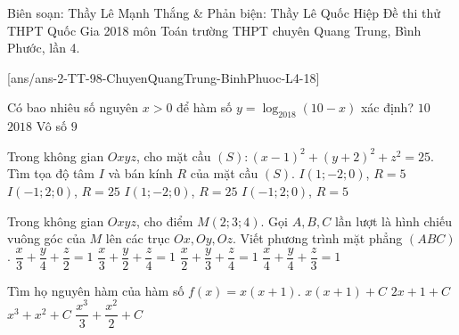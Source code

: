 \begin{name}
{Biên soạn: Thầy Lê Mạnh Thắng \& Phản biện: Thầy Lê Quốc Hiệp}
{Đề thi thử THPT Quốc Gia 2018 môn Toán trường THPT chuyên Quang Trung, Bình Phước, lần 4.}
\end{name}
\setcounter{ex}{0}\setcounter{bt}{0}
[ans/ans-2-TT-98-ChuyenQuangTrung-BinhPhuoc-L4-18]
\begin{ex}%
	Có bao nhiêu số nguyên $x>0$ để hàm số $y=\log_{2018}{(10-x)}$ xác định?
	\choice
	{$10$}
	{$2018$}
	{Vô số}
	{\True $9$}
\end{ex}
\begin{ex}%
	Trong không gian $Oxyz$, cho mặt cầu $(S)\colon (x-1)^2+(y+2)^2+z^2=25$. Tìm tọa độ tâm $I$ và bán kính $R$ của mặt cầu $(S)$.
	\choice
	{\True $I(1;-2;0)$, $R=5$}
	{$I(-1;2;0)$, $R=25$}
	{$I(1;-2;0)$, $R=25$}
	{$I(-1;2;0)$, $R=5$}
\end{ex}
\begin{ex}%
	Trong không gian $Oxyz$, cho điểm $M(2;3;4)$. Gọi $A,B,C$ lần lượt là hình chiếu vuông góc của $M$ lên các trục $Ox,Oy,Oz$. Viết phương trình mặt phẳng $(ABC)$.
	\choice
	{$\dfrac{x}{3}+\dfrac{y}{4}+\dfrac{z}{2}=1$}
	{$\dfrac{x}{3}+\dfrac{y}{2}+\dfrac{z}{4}=1$}
	{\True $\dfrac{x}{2}+\dfrac{y}{3}+\dfrac{z}{4}=1$}
	{$\dfrac{x}{4}+\dfrac{y}{4}+\dfrac{z}{3}=1$}
\end{ex}
\begin{ex}%
	Tìm họ nguyên hàm của hàm số $f(x)=x(x+1)$.
	\choice
	{$x(x+1)+C$}
	{$2x+1+C$}
	{$x^3+x^2+C$}
	{\True $\dfrac{x^3}{3}+\dfrac{x^2}{2}+C$}
\end{ex}
